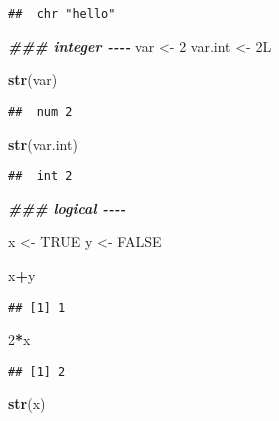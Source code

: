 \documentclass[
]{article}
\newenvironment{Shaded}{\begin{snugshade}}{\end{snugshade}}
\newcommand{\ConstantTok}[1]{\textcolor[rgb]{0.56,0.35,0.01}{#1}}
\newcommand{\DataTypeTok}[1]{\textcolor[rgb]{0.13,0.29,0.53}{#1}}
\newcommand{\DecValTok}[1]{\textcolor[rgb]{0.00,0.00,0.81}{#1}}
\newcommand{\DocumentationTok}[1]{\textcolor[rgb]{0.56,0.35,0.01}{\textbf{\textit{#1}}}}
\newcommand{\FunctionTok}[1]{\textcolor[rgb]{0.13,0.29,0.53}{\textbf{#1}}}
\newcommand{\NormalTok}[1]{#1}
\newcommand{\OtherTok}[1]{\textcolor[rgb]{0.56,0.35,0.01}{#1}}
\newcommand{\SpecialCharTok}[1]{\textcolor[rgb]{0.81,0.36,0.00}{\textbf{#1}}}
\begin{document}
\begin{verbatim}
##  chr "hello"
\end{verbatim}

\begin{Shaded}
\begin{Highlighting}[]
\DocumentationTok{\#\#\# integer {-}{-}{-}{-}}
\NormalTok{var }\OtherTok{\textless{}{-}} \DecValTok{2}
\NormalTok{var.int }\OtherTok{\textless{}{-}} \DecValTok{2}\DataTypeTok{L}

\FunctionTok{str}\NormalTok{(var)}
\end{Highlighting}
\end{Shaded}

\begin{verbatim}
##  num 2
\end{verbatim}

\begin{Shaded}
\begin{Highlighting}[]
\FunctionTok{str}\NormalTok{(var.int)}
\end{Highlighting}
\end{Shaded}

\begin{verbatim}
##  int 2
\end{verbatim}

\begin{Shaded}
\begin{Highlighting}[]
\DocumentationTok{\#\#\# logical {-}{-}{-}{-}}

\NormalTok{x }\OtherTok{\textless{}{-}} \ConstantTok{TRUE}
\NormalTok{y }\OtherTok{\textless{}{-}} \ConstantTok{FALSE}

\NormalTok{x}\SpecialCharTok{+}\NormalTok{y}
\end{Highlighting}
\end{Shaded}

\begin{verbatim}
## [1] 1
\end{verbatim}

\begin{Shaded}
\begin{Highlighting}[]
\DecValTok{2}\SpecialCharTok{*}\NormalTok{x}
\end{Highlighting}
\end{Shaded}

\begin{verbatim}
## [1] 2
\end{verbatim}

\begin{Shaded}
\begin{Highlighting}[]
\FunctionTok{str}\NormalTok{(x)}
\end{Highlighting}
\end{Shaded}
\end{document}
